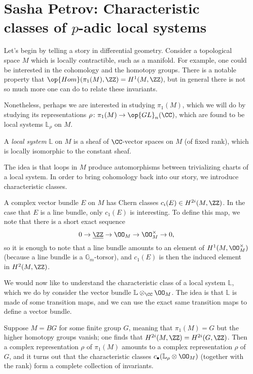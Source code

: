 \documentclass{article}
\begin{document}
\section{Sasha Petrov: Characteristic classes of \texorpdfstring{$p$}{p}-adic local systems}
Let's begin by telling a story in differential geometry. Consider a topological space $M$ which is locally contractible, such as a manifold. For example, one could be interested in the cohomology and the homotopy groups. There is a notable property that $\op{Hom}(\pi_1(M),\ZZ)=H^1(M,\ZZ)$, but in general there is not so much more one can do to relate these invariants.

Nonetheless, perhaps we are interested in studying $\pi_1(M)$, which we will do by studying its representations $\rho\colon\pi_1(M)\to\op{GL}_n(\CC)$, which are found to be local systems $\mathbb L_\rho$ on $M$.
\begin{definition}
	A \textit{local system} $\mathbb L$ on $M$ is a sheaf of $\CC$-vector spaces on $M$ (of fixed rank), which is locally isomorphic to the constant sheaf.
\end{definition}
The idea is that loops in $M$ produce automorphisms between trivializing charts of a local system. In order to bring cohomology back into our story, we introduce characteristic classes.
\begin{example}
	A complex vector bundle $E$ on $M$ has Chern classes $c_i(E)\in H^{2i}(M,\ZZ)$. In the case that $E$ is a line bundle, only $c_1(E)$ is interesting. To define this map, we note that there is a short exact sequence
	\[0\to\underline{\ZZ}\to\OO_M\to\OO_M^\times\to0,\]
	so it is enough to note that a line bundle amounts to an element of $H^1(M,\OO_M^\times)$ (because a line bundle is a $\mathbb G_m$-torsor), and $c_1(E)$ is then the induced element in $H^2(M,\ZZ)$.
\end{example}
We would now like to understand the characteristic class of a local system $\mathbb L$, which we do by consider the vector bundle $\mathbb L\otimes_\CC\OO_M$. The idea is that $\mathbb L$ is made of some transition maps, and we can use the exact same transition maps to define a vector bundle.
\begin{example}
	Suppose $M=BG$ for some finite group $G$, meaning that $\pi_1(M)=G$ but the higher homotopy groups vanish; one finds that $H^{2i}(M,\ZZ)=H^{2i}(G,\ZZ)$. Then a complex representation $\rho$ of $\pi_1(M)$ amounts to a complex representation $\rho$ of $G$, and it turns out that the characteristic classes $c_\bullet(\mathbb L_\rho\otimes\OO_M)$ (together with the rank) form a complete collection of invariants.
\end{example}
\end{document}
